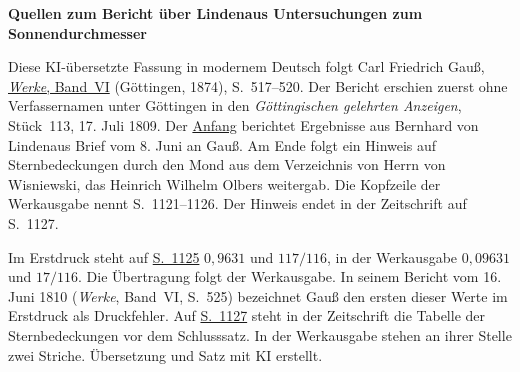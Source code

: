 \clearpage\thispagestyle{empty}
\begin{center}\textbf{Quellen zum Bericht über Lindenaus Untersuchungen zum Sonnendurchmesser}\end{center}
\noindent Diese KI-übersetzte Fassung in modernem Deutsch folgt Carl Friedrich Gauß, \href{https://gdz.sub.uni-goettingen.de/id/PPN236007467}{\emph{Werke}, Band~VI} (Göttingen, 1874), S.~517–520. Der Bericht erschien zuerst ohne Verfassernamen unter Göttingen in den \emph{Göttingischen gelehrten Anzeigen}, Stück~113, 17. Juli 1809. Der \href{https://images.p.sub.uni-goettingen.de/iiif/image/gdz:PPN319721507_1809:00001125/full/1650,/0/default.jpg}{Anfang} berichtet Ergebnisse aus Bernhard von Lindenaus Brief vom 8. Juni an Gauß. Am Ende folgt ein Hinweis auf Sternbedeckungen durch den Mond aus dem Verzeichnis von Herrn von Wisniewski, das Heinrich Wilhelm Olbers weitergab. Die Kopfzeile der Werkausgabe nennt S.~1121–1126. Der Hinweis endet in der Zeitschrift auf S.~1127.
\par\smallskip\noindent Im Erstdruck steht auf \href{https://images.p.sub.uni-goettingen.de/iiif/image/gdz:PPN319721507_1809:00001129/full/1650,/0/default.jpg}{S.~1125} $0{,}9631$ und $117/116$, in der Werkausgabe $0{,}09631$ und $17/116$. Die Übertragung folgt der Werkausgabe. In seinem Bericht vom 16. Juni 1810 (\emph{Werke}, Band~VI, S.~525) bezeichnet Gauß den ersten dieser Werte im Erstdruck als Druckfehler. Auf \href{https://images.p.sub.uni-goettingen.de/iiif/image/gdz:PPN319721507_1809:00001131/full/1650,/0/default.jpg}{S.~1127} steht in der Zeitschrift die Tabelle der Sternbedeckungen vor dem Schlusssatz. In der Werkausgabe stehen an ihrer Stelle zwei Striche. Übersetzung und Satz mit KI erstellt.
\clearpage
